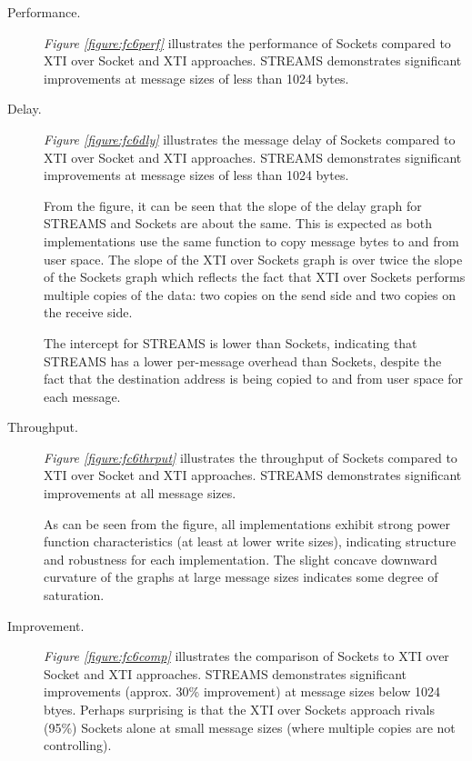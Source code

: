 \documentclass[letterpaper,final,notitlepage,twocolumn,10pt,twoside]{article}
\begin{document}
\begin{description}

\item[Performance.]

\textit{Figure \ref{figure:fc6perf}}
illustrates the performance of Sockets compared to XTI over Socket and XTI
approaches.  STREAMS demonstrates significant improvements at message sizes of
less than 1024 bytes.

\item[Delay.]

\textit{Figure \ref{figure:fc6dly}} illustrates
the message delay of Sockets compared to XTI over Socket and XTI approaches.
STREAMS demonstrates significant improvements at message sizes of less than
1024 bytes.

From the figure, it can be seen that the slope of the delay graph for STREAMS
and Sockets are about the same.  This is expected as both implementations use
the same function to copy message bytes to and from user space.  The slope of
the XTI over Sockets graph is over twice the slope of the Sockets graph which
reflects the fact that XTI over Sockets performs multiple copies of the data:
two copies on the send side and two copies on the receive side.

The intercept for STREAMS is lower than Sockets, indicating that STREAMS has a
lower per-message overhead than Sockets, despite the fact that the destination
address is being copied to and from user space for each message.

\item[Throughput.]

\textit{Figure \ref{figure:fc6thrput}}
illustrates the throughput of Sockets compared to XTI over Socket and XTI
approaches.  STREAMS demonstrates significant improvements at all message
sizes.

As can be seen from the figure, all implementations exhibit strong power
function characteristics (at least at lower write sizes), indicating structure
and robustness for each implementation.  The slight concave downward curvature
of the graphs at large message sizes indicates some degree of saturation.

\item[Improvement.]

\textit{Figure \ref{figure:fc6comp}}
illustrates the comparison of Sockets to XTI over Socket and XTI approaches.
STREAMS demonstrates significant improvements (approx. 30\% improvement) at
message sizes below 1024 btyes.  Perhaps surprising is that the XTI over
Sockets approach rivals (95\%) Sockets alone at small message sizes (where
multiple copies are not controlling).

\end{description}
\end{document}
